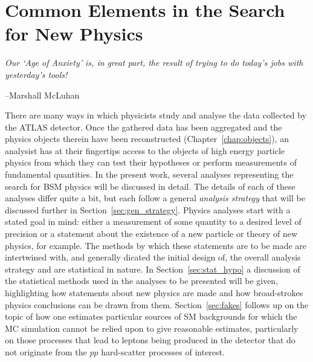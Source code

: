 \chapter{Common Elements in the Search for New Physics}
\label{chap:common_search}

\epigraph{
\textit{Our `Age of Anxiety' is, in great part, the result of trying to do today's jobs with yesterday's tools!}
}{--Marshall McLuhan}


There are many ways in which physicists study and analyse the data collected by
the ATLAS detector.
Once the gathered data has been aggregated and the physics objects therein
have been reconstructed (Chapter~\ref{chap:objects}), an analysist has at their fingertips access
to the objects of high energy particle physics from which they
can test their hypotheses or perform measurements of fundamental quantities.
In the present work, several analyses representing the search for BSM physics
will be discussed in detail.
The details of each of these analyses differ quite a bit, but each follow
a general \textit{analysis strategy} that will be discussed
further in Section~\ref{sec:gen_strategy}.
Physics analyses start with a stated goal in mind:
either a measurement of some quantity to a desired level of precision
or a statement about the existence of a new particle or theory of new physics, for example.
The methods by which these statements are to be made are intertwined with, and generally
dicated the initial design of, the overall
analysis strategy and are statistical in nature.
In Section~\ref{sec:stat_hypo} a discussion of the statistical methods used
in the analyses to be presented will be given, highlighting how statements about
new physics are made and how broad-strokes physics conclusions can be drawn from them.
Section~\ref{sec:fakes} follows up on the topic of how one estimates particular sources
of SM backgrounds for which the MC simulation cannot be relied upon to give reasonable
estimates, particularly on those processes that lead to leptons being produced in the detector
that do not originate from the $pp$ hard-scatter processes of interest.

